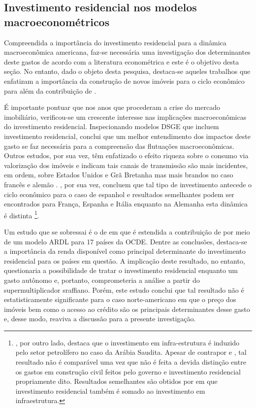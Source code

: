 \subsection{Investimento residencial nos modelos macroeconométricos}\label{RevEmpirica}

Compreendida a importância do investimento residencial para a dinâmica macroeconômica americana, faz-se necessária uma investigação dos determinantes deste gastos de acordo com a literatura econométrica e este é o objetivo desta seção. 
No entanto, dado o objeto desta pesquisa, destaca-se aqueles trabalhos que enfatizam a importância da construção de novos imóveis para o ciclo econômico para além da contribuição de \textcite{leamer_housing_2007}.


É importante pontuar que nos anos que procederam a crise do mercado imobiliário, verificou-se um crescente interesse nas implicações macroeconômicas do investimento residencial. Inspecionando modelos DSGE que incluem investimento residencial, \textcite{iacoviello_housing_2010} conclui que um melhor entendimento dos impactos deste gasto se faz necessária para a compreensão das flutuações macroeconômicas. Outros estudos, por sua vez, têm enfatizado o efeito riqueza sobre o consumo via valorização dos imóveis e indicam tais canais de transmissão são mais incidentes, em ordem, sobre Estados Unidos e Grã Bretanha mas mais brandos no caso francês e alemão \cites{sastre_assessment_2010}{chauvin_wealth_2010}{bassanetti_effects_2010}{arrondel_housing_2010}. 
\textcite{alvarez_does_2010}, por sua vez, concluem que tal tipo de investimento antecede o ciclo econômico para o caso de espanhol e resultados semelhantes podem ser encontrados para França, Espanha  e Itália enquanto na Alemanha esta dinâmica é distinta \cites{ferrara_common_2010}{ferrara_cyclical_2010}{ferrara_common_2010}\footnote{\textcite{alhowaish_causality_2015}, por outro lado, destaca que o investimento em infra-estrutura é induzido pelo setor petrolífero no caso da Arábia Saudita. Apesar de contrapor \textcite{green_follow_1997}  e \textcite{leamer_housing_2007}, tal resultado não é comparável uma vez que não é feita a devida distinção entre os gastos em construção civil feitos pelo governo e investimento residencial propriamente dito. Resultados semelhantes são obtidos por \textcite{ofori_testing_2003} em que investimento residencial também é somado ao investimento em infraestrutura.}. 

Um estudo que se sobressai é o de \textcite{arestis_residential_2015} em que é estendida a contribuição de \textcite{poterba_tax_1984} por meio de um modelo ARDL para 17 países da OCDE. Dentre as conclusões, destaca-se a importância da renda disponível como principal determinante do investimento residencial para os países em questão.  A implicação deste resultado, no entanto, questionaria a possibilidade de tratar o investimento residencial enquanto um gasto autônomo e, portanto, comprometeria a análise a partir do supermultiplicador sraffiano. Porém, este estudo conclui que tal resultado não é estatisticamente significante para o caso norte-americano em que o preço dos imóveis bem como o acesso ao crédito são os principais determinantes desse gasto e, desse modo, reaviva a discussão para a presente investigação.


